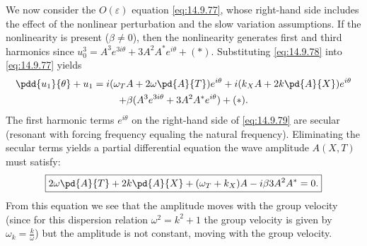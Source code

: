 We now consider the $O(\varepsilon)$ equation \eqref{eq:14.9.77}, whose right-hand side includes the effect of the nonlinear perturbation and the slow variation assumptions. If the nonlinearity is present ($\beta \neq 0$), then the nonlinearity generates first and third harmonics since $u_0^3 = A^3 e^{3i\theta} + 3A^2 A^* e^{i\theta} + (*)$. Substituting \eqref{eq:14.9.78} into \eqref{eq:14.9.77} yields
\begin{multline}
\pdd{u_1}{\theta} + u_1 = i(\omega_T A + 2\omega\pd{A}{T})e^{i\theta} + i(k_X A + 2k\pd{A}{X})e^{i\theta} \\
+ \beta(A^3 e^{3i\theta} + 3A^2 A^* e^{i\theta}) + (*). \label{eq:14.9.79}
\end{multline}
The first harmonic terms $e^{i\theta}$ on the right-hand side of \eqref{eq:14.9.79} are secular (resonant with forcing frequency equaling the natural frequency). Eliminating the secular terms yields a partial differential equation the wave amplitude $A(X,T)$ must satisfy:
\begin{equation}
\boxed{2\omega\pd{A}{T} + 2k\pd{A}{X} + (\omega_T + k_X)A - i\beta 3A^2 A^* = 0.}
\label{eq:14.9.80}
\end{equation}
From this equation we see that the amplitude moves with the group velocity (since for this dispersion relation $\omega^2 = k^2 + 1$ the group velocity is given by $\omega_k = \frac{k}{\omega}$) but the amplitude is not constant, moving with the group velocity.

